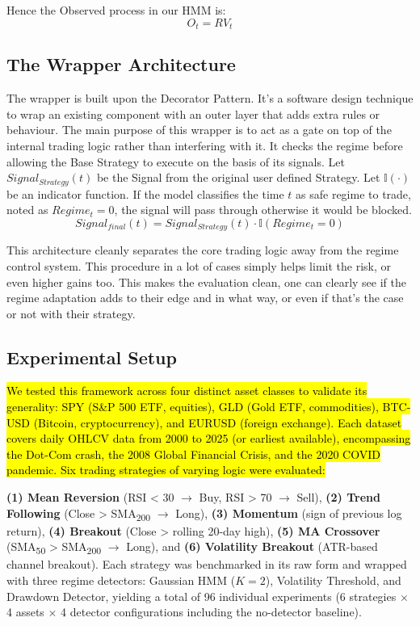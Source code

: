 \documentclass[conference]{IEEEtran}
\begin{document}
Hence the Observed process in our HMM is:
\begin{equation}
O_t = RV_t
\end{equation}

\subsection{The Wrapper Architecture}

The wrapper is built upon the Decorator Pattern. It's a software design technique to wrap an existing component with an outer layer that adds extra rules or behaviour. The main purpose of this wrapper is to act as a gate on top of the internal trading logic rather than interfering with it. It checks the regime before allowing the Base Strategy to execute on the basis of its signals. Let $Signal_{Strategy}(t)$ be the Signal from the original user defined Strategy. Let $\mathbb{I}(\cdot)$ be an indicator function. If the model classifies the time $t$ as safe regime to trade, noted as $Regime_t = 0$, the signal will pass through otherwise it would be blocked.
\begin{equation}
Signal_{final}(t) = Signal_{Strategy}(t) \cdot \mathbb{I}(Regime_t = 0)
\end{equation}

This architecture cleanly separates the core trading logic away from the regime control system. This procedure in a lot of cases simply helps limit the risk, or even higher gains too. This makes the evaluation clean, one can clearly see if the regime adaptation adds to their edge and in what way, or even if that's the case or not with their strategy.

\subsection{Experimental Setup}

\hl{We tested this framework across four distinct asset classes to validate its generality: SPY (S\&P 500 ETF, equities), GLD (Gold ETF, commodities), BTC-USD (Bitcoin, cryptocurrency), and EURUSD (foreign exchange). Each dataset covers daily OHLCV data from 2000 to 2025 (or earliest available), encompassing the Dot-Com crash, the 2008 Global Financial Crisis, and the 2020 COVID pandemic. Six trading strategies of varying logic were evaluated:}

\textbf{(1) Mean Reversion} (RSI < 30 $\rightarrow$ Buy, RSI > 70 $\rightarrow$ Sell), \textbf{(2) Trend Following} (Close > SMA\textsubscript{200} $\rightarrow$ Long), \textbf{(3) Momentum} (sign of previous log return), \textbf{(4) Breakout} (Close > rolling 20-day high), \textbf{(5) MA Crossover} (SMA\textsubscript{50} > SMA\textsubscript{200} $\rightarrow$ Long), and \textbf{(6) Volatility Breakout} (ATR-based channel breakout). Each strategy was benchmarked in its raw form and wrapped with three regime detectors: Gaussian HMM ($K=2$), Volatility Threshold, and Drawdown Detector, yielding a total of 96 individual experiments (6 strategies $\times$ 4 assets $\times$ 4 detector configurations including the no-detector baseline).
\end{document}
